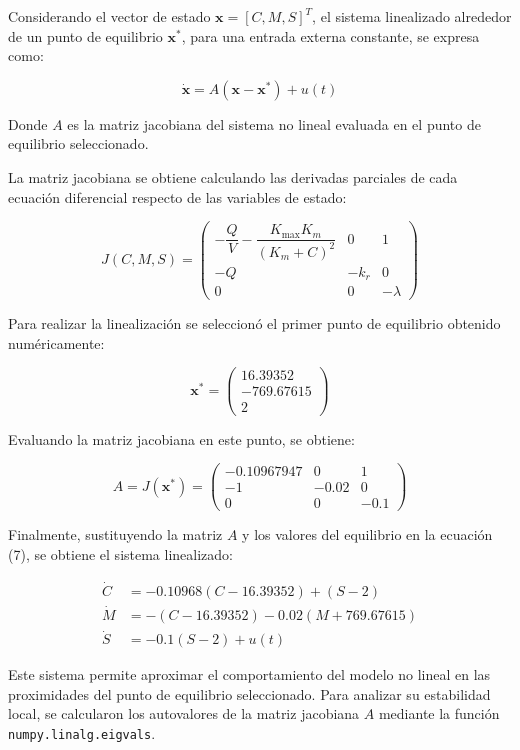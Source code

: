 \documentclass[11pt]{article}
\begin{document}
Considerando el vector de estado \(\mathbf{x}=[C,M,S]^T\), el sistema
linealizado alrededor de un punto de equilibrio \(\mathbf{x}^*\), para
una entrada externa constante, se expresa como:

\[
\dot{\mathbf{x}}=A(\mathbf{x}-\mathbf{x}^*) + u(t)
\tag{7}
\]

Donde \(A\) es la matriz jacobiana del sistema no lineal evaluada en el
punto de equilibrio seleccionado.

La matriz jacobiana se obtiene calculando las derivadas parciales de
cada ecuación diferencial respecto de las variables de estado:

\[
J(C,M,S)=
\begin{pmatrix}
-\dfrac{Q}{V}-\dfrac{K_{\max}K_m}{(K_m+C)^2} & 0 & 1\\[8pt]
-Q & -k_r & 0\\[4pt]
0 & 0 & -\lambda
\end{pmatrix}
\tag{8}
\]

Para realizar la linealización se seleccionó el primer punto de
equilibrio obtenido numéricamente:

\[
\mathbf{x}^*=
\begin{pmatrix}
16.39352\\
-769.67615\\
2
\end{pmatrix}
\]

Evaluando la matriz jacobiana en este punto, se obtiene:

\[
A=J(\mathbf{x}^*)=
\begin{pmatrix}
-0.10967947 & 0 & 1\\
-1 & -0.02 & 0\\
0 & 0 & -0.1
\end{pmatrix}
\tag{9}
\]

Finalmente, sustituyendo la matriz \(A\) y los valores del equilibrio en
la ecuación (7), se obtiene el sistema linealizado:

\[
\begin{aligned}
\dot C &= -0.10968(C-16.39352)+(S-2)\\[4pt]
\dot M &= -(C-16.39352)-0.02(M+769.67615)\\[4pt]
\dot S &= -0.1(S-2) + u(t)
\end{aligned}
\tag{10}
\]

Este sistema permite aproximar el comportamiento del modelo no lineal en
las proximidades del punto de equilibrio seleccionado. Para analizar su
estabilidad local, se calcularon los autovalores de la matriz jacobiana
\(A\) mediante la función \texttt{numpy.linalg.eigvals}.
\end{document}

